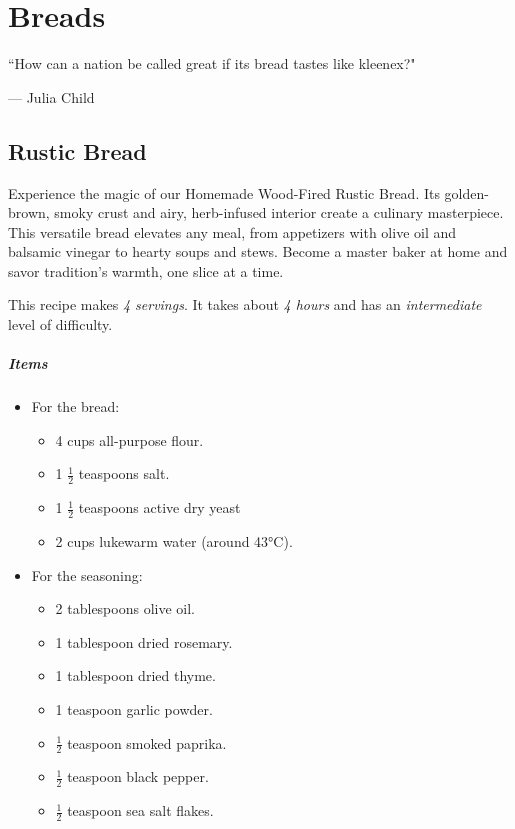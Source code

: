 \chapter{Breads}
\label{breads}
\epigraph{``How can a nation be called great if its bread tastes like kleenex?"}{--- \textup{Julia Child}}

\clearpage
\section{Rustic Bread}
\label{rusticbread}
Experience the magic of our Homemade Wood-Fired Rustic Bread. Its golden-brown, smoky crust and airy, herb-infused interior create a culinary masterpiece. This versatile bread elevates any meal, from appetizers with olive oil and balsamic vinegar to hearty soups and stews. Become a master baker at home and savor tradition's warmth, one slice at a time.

This recipe makes \emph{4 servings}. It takes about \emph{4 hours} and has an \emph{intermediate} level of difficulty. 

\paragraph{Items}
\begin{itemize}
	\item For the bread:
	\begin{itemize}[noitemsep]
	    \item[\ding{182}] 4 cups all-purpose flour.
	    \item[\ding{183}] 1 $\frac{1}{2}$ teaspoons salt.
	    \item[\ding{184}] 1 $\frac{1}{2}$ teaspoons active dry yeast
	    \item[\ding{185}] 2 cups lukewarm water (around 43°C).
	\end{itemize}
	\item For the seasoning:
	\begin{itemize}[noitemsep]
	    \item[\ding{182}] 2 tablespoons olive oil.
	    \item[\ding{183}] 1 tablespoon dried rosemary.
	    \item[\ding{184}] 1 tablespoon dried thyme.
	    \item[\ding{185}] 1 teaspoon garlic powder.
	    \item[\ding{186}] $\frac{1}{2}$ teaspoon smoked paprika.
	    \item[\ding{187}] $\frac{1}{2}$ teaspoon black pepper.
	    \item[\ding{188}] $\frac{1}{2}$ teaspoon sea salt flakes.
	\end{itemize}
\end{itemize}


